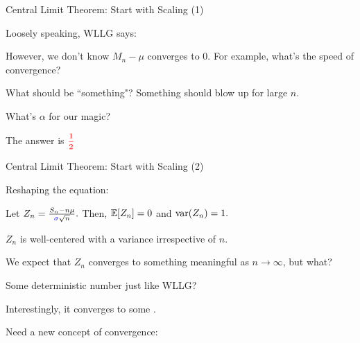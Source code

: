 \begin{frame}{Central Limit Theorem: Start with Scaling (1)}

\plitemsep 0.1in
 \bci
 \item<1-> Loosely speaking, WLLG says:

\item<2-> However, we don't know  $M_n -\mu$ converges to 0. For example, what's the speed of convergence?

\item<3->  What should be ``something"? Something should blow up for large $n$.
\item<5-> What's $\alpha$ for our magic?

\item<6-> The answer is $\redf{\mfrac{1}{2}}$

\eci
\end{frame}

\begin{frame}{Central Limit Theorem: Start with Scaling (2)}

\plitemsep 0.1in
\bci
\item Reshaping the equation:

\item<3-> Let $Z_n = \frac{S_n - n\mu}{{\color{blue} \sigma} \sqrt{n}}.$ Then, $\mathbb{E}[ Z_n ] = 0$ and $\text{var}( Z_n ) = 1.$

\item<4-> $Z_n$ is well-centered with a variance irrespective of $n.$

\item<5-> We expect that $Z_n$ converges to something meaningful as $n \rightarrow \infty$, but what?

\item<6-> Some deterministic number just like WLLG?

\item<7-> Interestingly, it converges to some .
\bci
\item<8-> Need a new concept of convergence: 
\eci

\eci
\end{frame}

